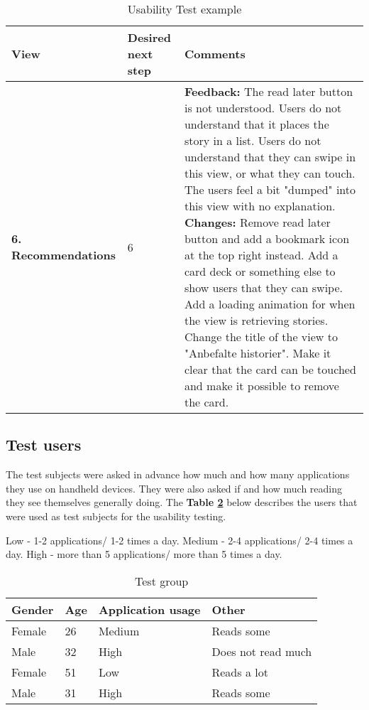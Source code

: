 \begin{table}
\begin{center}
	\caption{Usability Test example }
	\label{Tab:usabilityTestexample}
	\begin{tabular}{ | p{2cm} | p{2cm} | p{13cm}|}	

		\textbf{View} & \textbf{Desired next step} & \textbf{Comments}
		\\ \hline
		
		\textbf{6. Recommendations} & 6 & 
		\textbf{Feedback:} The read later button is not understood. Users do not understand that it places the story in a list. Users do not understand that they can swipe in this view, or what they can touch. The users feel a bit "dumped" into this view with no explanation.\newline
		\textbf{Changes:} Remove read later button and add a bookmark icon at the top right instead. Add a card deck or something else to show users that they can swipe. Add a loading animation for when the view is retrieving stories. Change the title of the view to "Anbefalte historier". Make it clear that the card can be touched and make it possible to remove the card.
		\\\hline
	\end{tabular}
\end{center}
\end{table}
	
\subsection{Test users}

The test subjects were asked in advance how much and how many applications they use on handheld devices. They were also asked if and how much reading they see themselves generally doing. The \textbf{Table \ref{Tab:testgroup}} below describes the users that were used as test subjects for the usability testing.  \newline

Low - 1-2 applications/ 1-2 times a day.\newline
Medium - 2-4 applications/ 2-4 times a day.\newline
High - more than 5 applications/ more than 5 times a day.

\begin{table}[H]
	\caption{Test group}
	\label{Tab:testgroup}
	\begin{center}
		\begin{tabular}{ | l | l | l | l |}
			\hline
			\textbf{Gender} & \textbf{Age} & \textbf{Application usage} & \textbf{Other} \\ \hline
			Female & 26 & Medium & Reads some \\\hline
			Male & 32 & High & Does not read much \\\hline
			Female & 51 & Low & Reads a lot \\\hline
			Male & 31 & High & Reads some \\\hline 	
		\end{tabular}
	\end{center}
\end{table}

